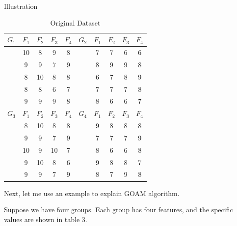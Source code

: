 \documentclass[
 size=14pt,
 paper=smartboard,  %
 mode=present, 		%
 display=slides, 	%
 style=tuliplab,  	%
 pauseslide,
 fleqn,leqno]{powerdot}
\begin{document}
\begin{slide}[toc=,bm=]{Illustration}
\begin{table}
\setlength{\abovecaptionskip}{0pt}
\setlength{\belowcaptionskip}{10pt}
\centering
\caption{Original Dataset}
\begin{tabular}{ccccc | ccccc}
  \toprule
  $G_1$ & $F_1$ & $F_2$ & $F_3$ & $F_4$ & $G_2$ & $F_1$ & $F_2$ & $F_3$ & $F_4$ \\
  \midrule
   &10 & 8 & 9 & 8 & &7 & 7 & 6 & 6 \\
   &9  & 9 & 7 & 9 & &8 & 9 & 9 & 8 \\
   &8  & 10& 8 & 8 & &6 & 7 & 8 & 9  \\
   &8  & 8 & 6 & 7 & &7 & 7 & 7 & 8  \\
   &9  & 9 & 9 & 8 & &8 & 6 & 6 & 7  \\
   \midrule
   $G_3$ & $F_1$ & $F_2$ & $F_3$ & $F_4$ & $G_4$ & $F_1$ & $F_2$ & $F_3$ & $F_4$ \\
   \midrule
   &8 & 10 & 8 & 8 & &9 & 8 & 8 & 8\\
   &9 & 9  & 7 & 9 & &7 & 7 & 7 & 9\\
   &10& 9  & 10& 7 & &8 & 6 & 6 & 8\\
   &9 & 10 & 8 & 6 & &9 & 8 & 8 & 7\\
   &9 & 9  & 7 & 9 & &8 & 7 & 9 & 8\\
  \bottomrule
\end{tabular}
\end{table}

\begin{note}
Next,
let me use an example to explain GOAM algorithm.

Suppose we have four groups.
Each group has four features,
and
the specific values are shown in table $3$.
\end{note}

\end{slide}
\end{document}
